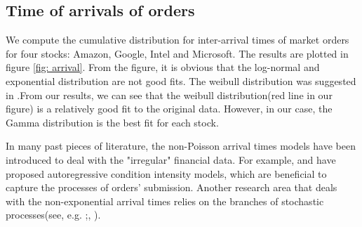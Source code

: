 \subsection{Time of arrivals of orders}
We compute the cumulative distribution for inter-arrival times of market orders for four stocks:  Amazon, Google,  Intel and Microsoft. The results are plotted in figure \ref{fig: arrival}.
From the figure,  it is obvious that the log-normal and exponential distribution are not good fits. The weibull distribution was suggested in \cite{ivanov2004common}.From our results,  we can see that the weibull distribution(red line in our figure) is a relatively good fit to the original data. However,  in our case,  the Gamma distribution is the best fit for each stock. 

In many past pieces of literature,  the non-Poisson arrival times models have been introduced to deal with the "irregular" financial data. For example, \cite{engle1997forecasting} and \cite{engle2000econometrics} have proposed autoregressive condition intensity models,  which are beneficial to capture the processes of orders' submission. Another research area that deals with the non-exponential arrival times relies on the branches of stochastic processes(see, e.g. \cite{clark1973subordinated};\cite{silva2007stochastic}, \cite{huth2012times}). 


